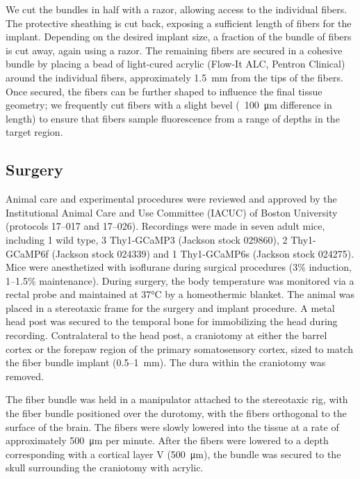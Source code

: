 We cut the bundles in half with a razor, allowing access to the 
individual fibers. The protective sheathing is cut back, exposing a 
sufficient length of fibers for the implant. Depending on the desired 
implant size, a fraction of the bundle of fibers is cut away, again 
using a razor. The remaining fibers are secured in a cohesive bundle 
by placing a bead of light-cured acrylic (Flow-It ALC, Pentron 
Clinical) around the individual fibers, approximately 
1.5~\si{\milli\meter} from the tips of the fibers. Once secured, the 
fibers can be further shaped to influence the final tissue geometry; 
we frequently cut fibers with a slight bevel (~100~\si{\micro\meter} 
difference in length) to ensure that fibers sample fluorescence from a
 range of depths in the target region.

\subsection{Surgery}

Animal care and experimental procedures were reviewed and approved by 
the Institutional Animal Care and Use Committee (IACUC) of Boston 
University (protocols 17--017 and 17--026). Recordings were made in 
seven adult mice, including 1 wild type, 3 Thy1-GCaMP3 (Jackson stock 
029860), 2 Thy1-GCaMP6f (Jackson stock 024339) and 1 Thy1-GCaMP6s 
(Jackson stock 024275). Mice were anesthetized with isoflurane during 
surgical procedures (3\% induction, 1--1.5\% maintenance). During 
surgery, the body temperature was monitored via a rectal probe and 
maintained at 37\si{\celsius} by a homeothermic blanket. The animal 
was placed in a stereotaxic frame for the surgery and implant 
procedure. A metal head post was secured to the temporal bone for 
immobilizing the head during recording. Contralateral to the head 
post, a craniotomy at either the barrel cortex or the forepaw region 
of the primary somatosensory cortex, sized to match the fiber bundle 
implant (0.5--1~\si{\milli\meter}). The dura within the craniotomy was
 removed.



The fiber bundle was held in a manipulator attached to the stereotaxic
 rig, with the fiber bundle positioned over the durotomy, with the 
fibers orthogonal to the surface of the brain. The fibers were slowly 
lowered into the tissue at a rate of approximately 
500~\si{\micro\meter} per minute. After the fibers were lowered to a 
depth corresponding with a cortical layer V (500~\si{\micro\meter}), 
the bundle was secured to the skull surrounding the craniotomy with 
acrylic.


